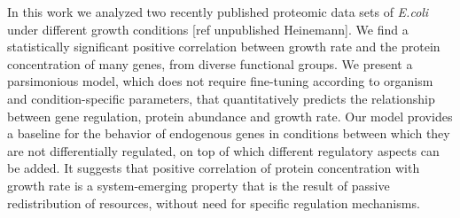 In this work we analyzed two recently published proteomic data sets of \emph{E.coli} under different growth conditions \cite{Valgepea2013} [ref unpublished Heinemann].
We find a statistically significant positive correlation between growth rate and the protein concentration of many genes, from diverse functional groups.
We present a parsimonious model, which does not require fine-tuning according to organism and condition-specific parameters, that quantitatively predicts the relationship between gene regulation, protein abundance and growth rate.
Our model provides a baseline for the behavior of endogenous genes in conditions between which they are not differentially regulated, on top of which different regulatory aspects can be added.
It suggests that positive correlation of protein concentration with growth rate is a system-emerging property that is the result of passive redistribution of resources, without need for specific regulation mechanisms.
